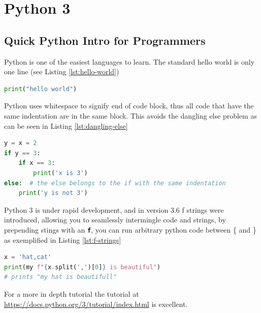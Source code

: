 \documentclass[]{report}   %
\begin{document}
\section{Python 3}
\subsection{Quick Python Intro for Programmers}
Python is one of the easiest languages to learn. The standard hello world is
only one line (see Listing \ref{lst:hello-world})

\begin{minipage}{\linewidth}
\begin{lstlisting}[language=python, label={lst:hello-world}, 
                   caption={Python hello world}]
print("hello world")
\end{lstlisting}
\end{minipage}

Python uses whitespace to signify end of code block, thus all code that have
the same indentation are in the same block. This avoids the dangling else
problem\cite{dangling_else} as can be seen in Listing \ref{lst:dangling-else}

\begin{minipage}{\linewidth}
\begin{lstlisting}[language=python, label={lst:dangling-else}, 
                   caption={Python: no dangling else}]
y = x = 2
if y == 3:
    if x == 3:
        print('x is 3')
else:  # the else belongs to the if with the same indentation
    print('y is not 3')
\end{lstlisting}
\end{minipage}

Python 3 is under rapid development, and in version 3.6 f strings were
introduced, allowing you to seamlessly intermingle code and strings, by
prepending stings with an \textbf{\texttt{f}}, you can run arbitrary python
code between \{ and \} as exemplified in Listing \ref{lst:f-strings}

\begin{minipage}{\linewidth}
\begin{lstlisting}[language=python, label={lst:f-strings}, 
                   caption={Python: f strings}]
x = 'hat,cat'
print(my f"{x.split(',')[0]} is beautiful")
# prints "my hat is beautifull"
\end{lstlisting}
\end{minipage}

For a more in depth tutorial the tutorial at \url{
https://docs.python.org/3/tutorial/index.html} is excellent.
\end{document}
